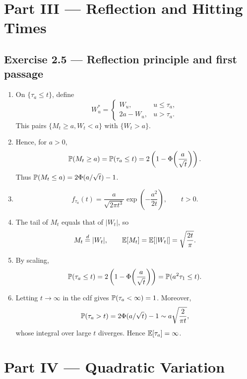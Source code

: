 \section*{Part III --- Reflection and Hitting Times}

\subsection*{Exercise 2.5 --- Reflection principle and first passage}
\begin{enumerate}
  \item On \(\{\tau_a\leq t\}\), define
  \[
  W_u^*=\begin{cases}
  W_u,&u\leq\tau_a,\\
  2a-W_u,&u>\tau_a.
  \end{cases}
  \]
  This pairs \(\{M_t\geq a,W_t<a\}\) with \(\{W_t>a\}\).
  \item Hence, for \(a>0\),
  \[
  \mathbb{P}(M_t\geq a)=\mathbb{P}(\tau_a\leq t)
  =2\left(1-\Phi\!\left(\frac{a}{\sqrt t}\right)\right).
  \]
  Thus \(\mathbb{P}(M_t\leq a)=2\Phi(a/\sqrt t)-1\).
  \item
  \[
  f_{\tau_a}(t)=\frac{a}{\sqrt{2\pi t^3}}
  \exp\!\left(-\frac{a^2}{2t}\right),
  \qquad t>0.
  \]
  \item The tail of \(M_t\) equals that of \(|W_t|\), so
  \[
  M_t\overset{d}=|W_t|,
  \qquad
  \mathbb{E}[M_t]=\mathbb{E}[|W_t|]=\sqrt{\frac{2t}{\pi}}.
  \]
  \item By scaling,
  \[
  \mathbb{P}(\tau_a\leq t)
  =2\left(1-\Phi\!\left(\frac{a}{\sqrt t}\right)\right)
  =\mathbb{P}(a^2\tau_1\leq t).
  \]
  \item Letting \(t\to\infty\) in the cdf gives
  \(\mathbb{P}(\tau_a<\infty)=1\). Moreover,
  \[
  \mathbb{P}(\tau_a>t)
  =2\Phi(a/\sqrt t)-1
  \sim a\sqrt{\frac{2}{\pi t}},
  \]
  whose integral over large \(t\) diverges. Hence \(\mathbb{E}[\tau_a]=\infty\).
\end{enumerate}

\section*{Part IV --- Quadratic Variation}

